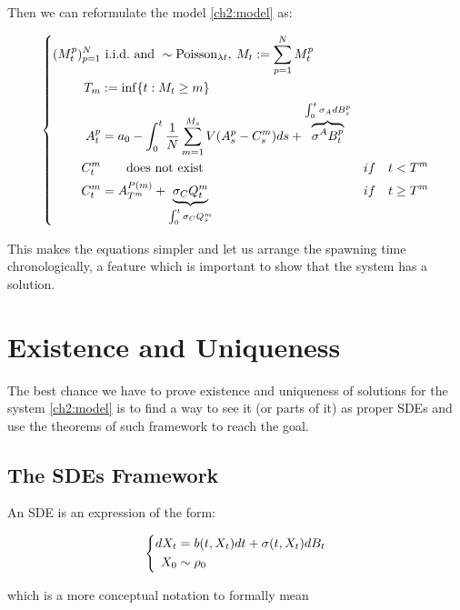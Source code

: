 Then we can reformulate the model \ref{ch2:model} as:

\begin{equation}\label{ch2:model-reformulation}
\left\{
\begin{aligned}
(M^p_t)_{p=1}^N 
&\text{ \mbox{i.i.d.}\ and } \sim \text{Poisson}_{\lambda t}
,\: M_t := \sum_{p=1}^N M_t^p
&
\\
T_m
&:= \inf \{ t : M_t \geq m \}
&
\\
A_t^p 
&= a_0 
- \int_0^t \frac{1}{N} \sum _{m = 1}^{M_s} V(A_s^p - C_s^m) d s
+ 
\overbrace{\sigma^A B_t^p}^{\int_0^t \sigma_A d B_s^p}
&
\\
C_t^m 
&\qquad\text{does not exist} 
&if \quad t < T^m
\\
C_t^m
&= A_{T^m}^{P(m)} + \underbrace{\sigma_C Q_t^m}_{\int_0^t \sigma_C Q_s^m}
&if \quad t \geq T^m
\end{aligned}
\right.
\end{equation}

This makes the equations simpler and let us arrange the spawning time chronologically, a feature which is important to show that the system has a solution.

\section{Existence and Uniqueness}

The best chance we have to prove existence and uniqueness of solutions for the system \ref{ch2:model} is to find a way to see it (or parts of it) as proper SDEs and use the theorems of such framework to reach the goal.

\subsection{The SDEs Framework}\label{ch2:section:sde-framework}

An SDE is an expression of the form:

\begin{equation}
\left\{
\begin{aligned}
d X_t &= b(t, X_t) dt + \sigma(t, X_t) d B_t	\\
X_0 &\sim \rho_0
\end{aligned}
\right.
\end{equation}\label{ch2:eq:general-sde}

which is a more conceptual notation to formally mean

